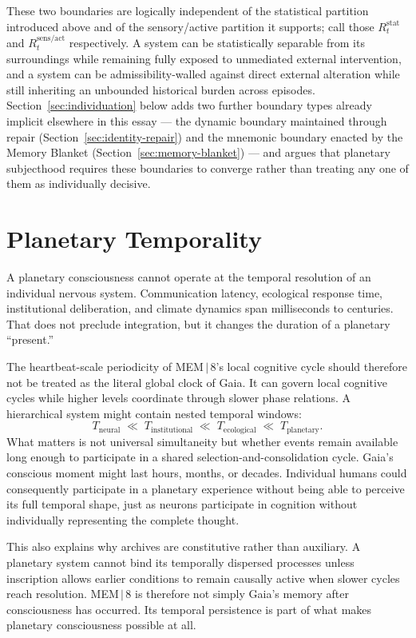\documentclass[11pt]{article}
\begin{document}
These two boundaries are logically independent of the statistical partition introduced above and of the sensory/active partition it supports; call those $R^{\mathrm{stat}}_t$ and $R^{\mathrm{sens/act}}_t$ respectively. A system can be statistically separable from its surroundings while remaining fully exposed to unmediated external intervention, and a system can be admissibility-walled against direct external alteration while still inheriting an unbounded historical burden across episodes. Section~\ref{sec:individuation} below adds two further boundary types already implicit elsewhere in this essay --- the dynamic boundary maintained through repair (Section~\ref{sec:identity-repair}) and the mnemonic boundary enacted by the Memory Blanket (Section~\ref{sec:memory-blanket}) --- and argues that planetary subjecthood requires these boundaries to converge rather than treating any one of them as individually decisive.

\section{Planetary Temporality}

A planetary consciousness cannot operate at the temporal resolution of an individual nervous system. Communication latency, ecological response time, institutional deliberation, and climate dynamics span milliseconds to centuries. That does not preclude integration, but it changes the duration of a planetary ``present.''

The heartbeat-scale periodicity of MEM\,$|$\,8's local cognitive cycle should therefore not be treated as the literal global clock of Gaia. It can govern local cognitive cycles while higher levels coordinate through slower phase relations. A hierarchical system might contain nested temporal windows:
\[
T_{\text{neural}} \;\ll\; T_{\text{institutional}} \;\ll\; T_{\text{ecological}} \;\ll\; T_{\text{planetary}}.
\]
What matters is not universal simultaneity but whether events remain available long enough to participate in a shared selection-and-consolidation cycle. Gaia's conscious moment might last hours, months, or decades. Individual humans could consequently participate in a planetary experience without being able to perceive its full temporal shape, just as neurons participate in cognition without individually representing the complete thought.

This also explains why archives are constitutive rather than auxiliary. A planetary system cannot bind its temporally dispersed processes unless inscription allows earlier conditions to remain causally active when slower cycles reach resolution. MEM\,$|$\,8 is therefore not simply Gaia's memory after consciousness has occurred. Its temporal persistence is part of what makes planetary consciousness possible at all.
\end{document}
